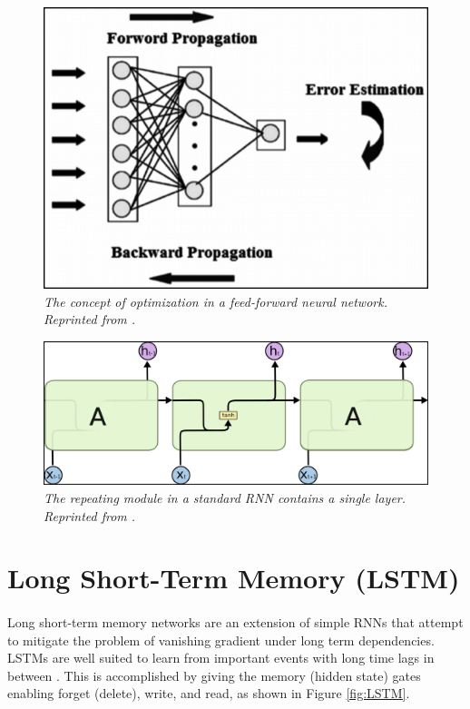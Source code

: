 \begin{figure}[H]
  \centering
  \caption[The concept of optimization in a feed-forward neural network.]{\emph{The concept of optimization in a feed-forward neural network. \\Reprinted from \citeauthor{donges_2019}. \citeyear{donges_2019}}}\label{fig:bpp}
  \includegraphics[scale = 0.4]{figures/bpp.jpg}  
\end{figure}

\begin{figure}[H]
  \centering
  \caption[The repeating module in a standard RNN contains a single layer.]{\emph{The repeating module in a standard RNN contains a single layer. \\Reprinted from \citeauthor{olah_2015} \citeyear{olah_2015}.}}\label{fig:RNN_2}
  \includegraphics[scale = 0.2]{figures/RNN_2.jpg}  
\end{figure}

\section{Long Short-Term Memory (LSTM)}
\paragraph{}
Long short-term memory networks are an extension of simple RNNs that attempt to mitigate the problem of vanishing gradient under long term dependencies. LSTMs are well suited to learn from important events with long time lags in between \cite{donges_2019,olah_2015}. This is accomplished by giving the memory (hidden state) gates enabling forget (delete), write, and read, as shown in Figure \ref{fig:LSTM}.

